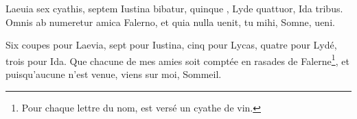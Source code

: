 \documentclass[12pt]{book}
\begin{document}
\begin{alignment}
    \begin{edition}
          Laeuia sex cyathis, septem Iustina bibatur, 
    quinque %
    , Lyde quattuor, Ida tribus. 
    Omnis ab 
    numeretur amica Falerno, 
    et quia nulla uenit, tu mihi, Somne, ueni. 
    \end{edition}
    \begin{translation}
                Six coupes pour Laevia, sept pour Iustina, 
                cinq pour Lycas, quatre pour Lydé, trois pour Ida. 
                Que chacune de mes amies soit comptée en rasades de Falerne\footnote{Pour chaque lettre du nom, est versé un cyathe de vin.}, 
                et puisqu'aucune n'est venue, viens sur moi, Sommeil.
    \end{translation}
  \end{alignment}
  
\begin{alignment}
    \begin{edition}
    \end{edition}
    \begin{translation}
    \end{translation}
    \end{alignment}
\end{document}
